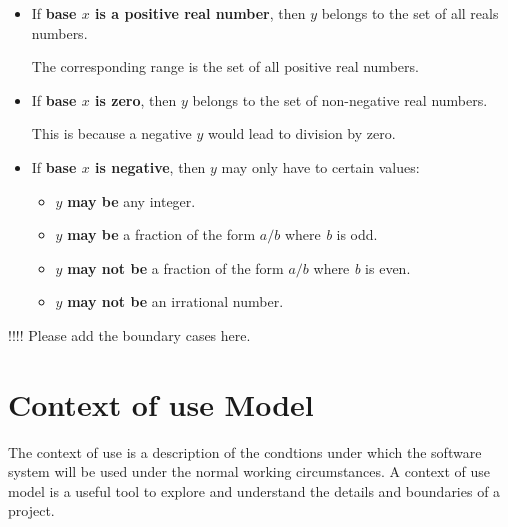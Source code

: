 \documentclass[11pt,a4paper]{report}
\theoremstyle{definition}
\theoremstyle{remark}
\begin{document}
        \begin{itemize}
            \item If \textbf{base $x$ is a positive real number}, then $y$ belongs to the set of all reals numbers.
            
            The corresponding range is the set of all positive real numbers.
            
            \item If \textbf{base $x$ is zero}, then $y$ belongs to the set of non-negative real numbers.
            
            This is because a negative $y$ would lead to division by zero.
            
            \item If \textbf{base $x$ is negative}, then $y$ may only have to certain values:

                    \begin{itemize}
                        \item $y$ \textbf{may be} any integer.
                        
                        \item $y$ \textbf{may be} a fraction of the form $a/b$ where \emph{b} is odd.
                        
                        \item $y$ \textbf{may not be} a fraction of the form $a/b$ where \emph{b} is even.
                        
                        \item $y$ \textbf{may not be} an irrational number. 
                        
                    \end{itemize}
            
        \end{itemize}
        
        !!!! Please add the boundary cases here.
        
        \section{Context of use Model}
            The context of use is a description of the condtions under which the software system will be used under the normal working circumstances. 
            A context of use model is a useful tool to explore and understand the details and boundaries of a project. 
            
\end{document}
